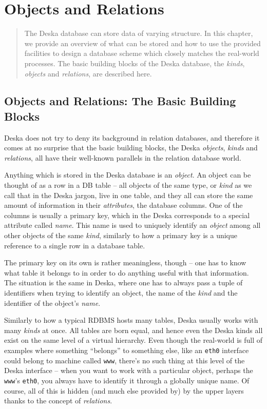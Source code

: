 \documentclass[deska]{subfiles}
\begin{document}
\chapter{Objects and Relations}

\begin{abstract}
The Deska database can store data of varying structure.  In this chapter, we provide an overview of what can be stored
and how to use the provided facilities to design a database scheme which closely matches the real-world processes.  The
basic building blocks of the Deska database, the {\em kinds}, {\em objects} and {\em relations}, are described here.
\end{abstract}

\section{Objects and Relations: The Basic Building Blocks}
\label{sec:objects-and-relations}

Deska does not try to deny its background in relation databases, and therefore it comes at no surprise that the basic
building blocks, the Deska {\em objects}, {\em kinds} and {\em relations}, all have their well-known parallels in the
relation database world.

Anything which is stored in the Deska database is an {\em object}. An object can be thought of as a row in a DB table --
all objects of the same type, or {\em kind} as we call that in the Deska jargon, live in one table, and they all can
store the same amount of information in their {\em attributes}, the database columns.  One of the columns is usually a
primary key, which in the Deska corresponds to a special attribute called {\em name}.  This name is used to uniquely
identify an {\em object} among all other objects of the same {\em kind}, similarly to how a primary key is a unique
reference to a single row in a database table.

The primary key on its own is rather meaningless, though -- one has to know what table it belongs to in order to do
anything useful with that information.  The situation is the same in Deska, where one has to always pass a tuple of
identifiers when trying to identify an object, the name of the {\em kind} and the identifier of the object's {\em name}.

Similarly to how a typical RDBMS hosts many tables, Deska usually works with many {\em kinds} at once.  All tables are
born equal, and hence even the Deska kinds all exist on the same level of a virtual hierarchy.  Even though the
real-world is full of examples where something ``belongs'' to something else, like an {\tt eth0} interface could belong
to machine called {\tt www}, there's no such thing at this level of the Deska interface -- when you want to work with a
particular object, perhaps the {\tt www}'s {\tt eth0}, you always have to identify it through a globally unique name.
Of course, all of this is hidden (and much else provided by) by the upper layers thanks to the concept of {\em
relations}.
\end{document}
